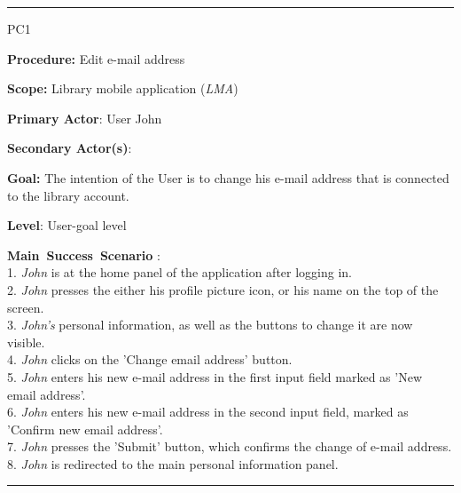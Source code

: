 \vspace{0.5cm}
\hrule
\begin{lyxlist}{PC1}
\small{
\item [\textbf{Procedure:}] Edit e-mail address
\item [\textbf{Scope:}] Library mobile application (\emph{LMA})
\item [\textbf{Primary Actor}:] User John
\item [\textbf{Secondary Actor(s)}:] 
\item [\textbf{Goal:}] The intention of the User is to change his e-mail address
that is connected to the library account.
\item [\textbf{Level}:] User-goal level
\item [\textbf{Main~Success~Scenario}]:\\
1. \emph{John} is at the home panel of the application after logging in.\\
2. \emph{John} presses the either his profile picture icon, or his name on the
top of the screen.\\
3. \emph{John's} personal information, as well as the buttons to change it are
now visible.\\
4. \emph{John} clicks on the 'Change email address' button.\\
5. \emph{John} enters his new e-mail address in the first input field marked as
'New email address'. \\
6. \emph{John} enters his new e-mail address in the second input field, marked
as 'Confirm new email address'. \\
7. \emph{John} presses the 'Submit' button, which confirms the change of e-mail
address. \\
8. \emph{John} is redirected to the main personal information panel.\\

}

\end{lyxlist}
\hrule



